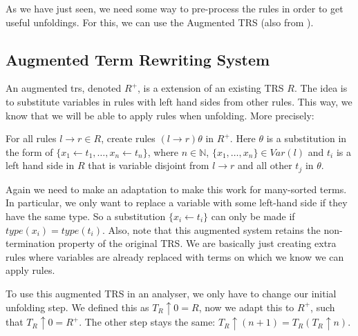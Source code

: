 As we have just seen, we need some way to pre-process the rules in order to get useful unfoldings. For this, we can use the Augmented TRS (also from \cite{Payet:Unfolding}).  

\subsection*{Augmented Term Rewriting System}
An augmented trs, denoted $R^+$, is a extension of an existing TRS $R$. The idea is to substitute variables in rules with left hand sides from other rules. This way, we know that we will be able to apply rules when unfolding. More precisely:
\begin{definition}
\label{def:augmentedtrs}
For all rules $l \rightarrow r \in R$, create rules $(l \rightarrow r)\theta$ in $R^+$. Here $\theta$ is a substitution in the form of $\{ x_1 \leftarrow t_1, \dots, x_n \leftarrow t_n \}$, where $n \in \mathbb{N}$, $\{ x_1, \dots, x_n \} \in \textit{Var}(l)$ and $t_i$ is a left hand side in $R$ that is variable disjoint from $l \rightarrow r$ and all other $t_j$ in $\theta$. 
\end{definition}

Again we need to make an adaptation to make this work for many-sorted terms. In particular, we only want to replace a variable with some left-hand side if they have the same type. So a substitution $\{ x_i \leftarrow t_i \}$ can only be made if $\textit{type}(x_i) = \textit{type}(t_i)$. Also, note that this augmented system retains the non-termination property of the original TRS. We are basically just creating extra rules where variables are already replaced with terms on which we know we can apply rules.  

To use this augmented TRS in an analyser, we only have to change our initial unfolding step. We defined this as $T_R \uparrow 0 = R$, now we adapt this to $R^+$, such that $T_R \uparrow 0 = R^+$. The other step stays the same: $T_R \uparrow (n + 1) = T_R(T_R \uparrow n)$. 

